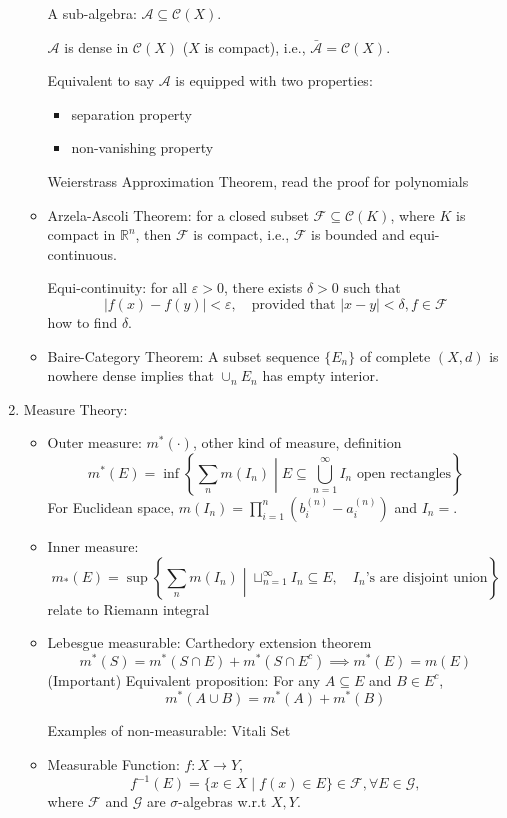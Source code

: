 \begin{enumerate}
\begin{itemize}
A sub-algebra: $\mathcal{A}\subseteq\mathcal{C}(X)$.

$\mathcal{A}$ is dense in $\mathcal{C}(X)$ ($X$ is compact), i.e., $\bar{\mathcal{A}}=\mathcal{C}(X)$.

Equivalent to say $\mathcal{A}$ is equipped with two properties:
\begin{itemize}
\item
separation property
\item
non-vanishing property
\end{itemize}
Weierstrass Approximation Theorem, read the proof for polynomials
\item
Arzela-Ascoli Theorem: 
for a closed subset $\mathcal{F}\subseteq\mathcal{C}(K)$, where $K$ is compact in $\mathbb{R}^n$, then 
$\mathcal{F}$ is compact, i.e., $\mathcal{F}$ is bounded and equi-continuous.

Equi-continuity: for all $\varepsilon>0$, there exists $\delta>0$ such that 
\[
|f(x)-f(y)|<\varepsilon,\quad
\text{provided that }|x-y|<\delta, f\in\mathcal{F}
\]
how to find $\delta$.
\item
Baire-Category Theorem:
A subset sequence $\{E_n\}$ of complete $(X,d)$ is nowhere dense implies that $\cup_nE_n$ has empty interior.

\end{itemize}
\item
Measure Theory:
\begin{itemize}
\item
Outer measure: $m^*(\cdot)$, other kind of measure, definition
\[
m^*(E) = \inf\left\{
\sum_nm(I_n)\middle|
E\subseteq\bigcup_{n=1}^{\infty}I_n\text{ open rectangles}
\right\}
\]
For Euclidean space, $m(I_n) = \prod_{i=1}^n(b_i^{(n)} - a_i^{(n)})$ and $I_n = $.
\item
Inner measure:
\[
m_*(E) = \sup\left\{
\sum_nm(I_n)
\middle|
\sqcup_{n=1}^\infty I_n\subseteq E,
\quad
\text{$I_n$'s are disjoint union}
\right\}
\]
relate to Riemann integral
\item
Lebesgue measurable: Carthedory extension theorem
\[
m^*(S) = m^*(S\cap E) + m^*(S\cap E^c)\implies m^*(E) = m(E)
\]
(Important) Equivalent proposition:
For any $A\subseteq E$ and $B\in E^c$, 
\[
m^*(A\cup B) = m^*(A)+m^*(B)
\]

Examples of non-measurable: Vitali Set
\item
Measurable Function: $f:X\to Y$,
\[
f^{-1}(E)=\{x\in X\mid f(x)\in E\}\in\mathcal{F},\forall E\in\mathcal{G},
\]
where $\mathcal{F}$ and $\mathcal{G}$ are $\sigma$-algebras w.r.t $X,Y$.


\end{itemize}
\end{enumerate}
